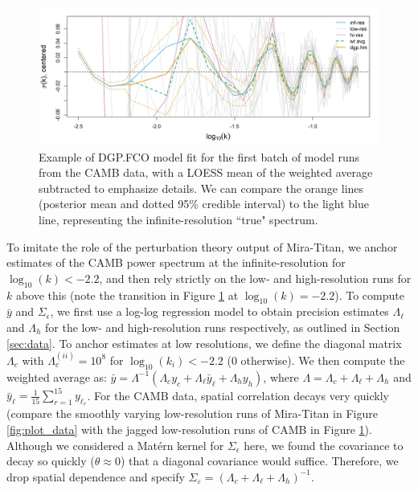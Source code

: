 \documentclass[11pt]{article}
\begin{document}
\begin{figure}
    \centering
    \includegraphics[width=\textwidth]{CAMB_fit_model1.jpeg}
    \caption{Example of DGP.FCO model fit for the first batch of model runs from the CAMB data, 
             with a LOESS mean of the weighted average subtracted to emphasize details. We can 
             compare the orange lines (posterior mean and dotted 95\% credible interval) to the 
             light blue line, representing the infinite-resolution ``true" spectrum.}   
    \label{fig:fit_camb}
\end{figure}

To imitate the role of the perturbation theory output of Mira-Titan, we anchor 
estimates of the CAMB power spectrum at the infinite-resolution for 
$\log_{10}(k) < -2.2$, and then rely strictly on the low- and high-resolution 
runs for $k$ above this (note the transition
in Figure \ref{fig:fit_camb} at $\log_{10}(k) = -2.2$). To compute $\bar{y}$ and $\Sigma_\epsilon$,
we first use a log-log regression model to obtain precision estimates $\Lambda_\ell$ and $\Lambda_h$
for the low- and high-resolution runs respectively, as outlined in Section \ref{sec:data}. 
To anchor estimates at low resolutions, we define the diagonal matrix $\Lambda_c$ with 
$\Lambda_c^{(ii)}=10^8$ for $\log_{10}(k_i) < -2.2$ ($0$ otherwise).
We then compute the weighted average as: $\bar y = \Lambda^{-1}(\Lambda_c y_c + 
\Lambda_{\ell} \bar{y}_\ell + \Lambda_h y_h)$, where $\Lambda = \Lambda_c + \Lambda_\ell + \Lambda_h$ 
and $\bar{y}_\ell = \frac{1}{15}\sum_{r=1}^{15} y_{\ell_r}$.
For the CAMB data, spatial correlation decays very quickly
(compare the smoothly varying low-resolution runs of Mira-Titan in Figure \ref{fig:plot_data} 
with the jagged low-resolution runs of CAMB in Figure \ref{fig:fit_camb}). 
Although we considered a Mat\'ern kernel for $\Sigma_\epsilon$ here, we found the covariance
to decay so quickly ($\theta\approx 0$) that a diagonal covariance would suffice.
Therefore, we drop spatial dependence and specify $\Sigma_\varepsilon = 
(\Lambda_c+\Lambda_\ell+\Lambda_h)^{-1}$.  
\end{document}
